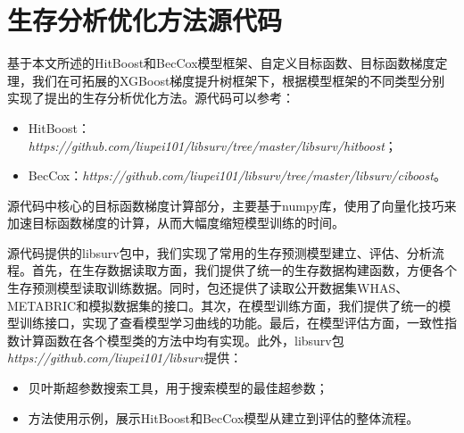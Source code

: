
\thesisappendix

\chapter{生存分析优化方法源代码}

基于本文所述的HitBoost和BecCox模型框架、自定义目标函数、目标函数梯度定理，我们在可拓展的XGBoost梯度提升树框架下，根据模型框架的不同类型分别实现了提出的生存分析优化方法。源代码可以参考：
\begin{itemize}
  \item HitBoost：\emph{https://github.com/liupei101/libsurv/tree/master/libsurv/hitboost}；
  \item BecCox：\emph{https://github.com/liupei101/libsurv/tree/master/libsurv/ciboost}。
\end{itemize}
源代码中核心的目标函数梯度计算部分，主要基于numpy库，使用了向量化技巧来加速目标函数梯度的计算，从而大幅度缩短模型训练的时间。

源代码提供的libsurv包中，我们实现了常用的生存预测模型建立、评估、分析流程。首先，在生存数据读取方面，我们提供了统一的生存数据构建函数，方便各个生存预测模型读取训练数据。同时，包还提供了读取公开数据集WHAS、METABRIC和模拟数据集的接口。其次，在模型训练方面，我们提供了统一的模型训练接口，实现了查看模型学习曲线的功能。最后，在模型评估方面，一致性指数计算函数在各个模型类的方法中均有实现。此外，libsurv包\emph{https://github.com/liupei101/libsurv}提供：
\begin{itemize}
  \item 贝叶斯超参数搜索工具，用于搜索模型的最佳超参数；
  \item 方法使用示例，展示HitBoost和BecCox模型从建立到评估的整体流程。
\end{itemize}